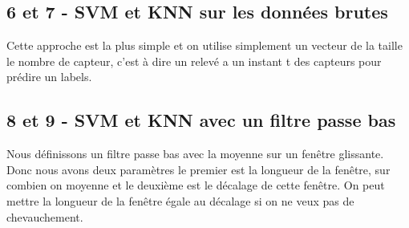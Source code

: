 \documentclass{article}[12pt]
\begin{document}
\subsection{6 et 7 - SVM et KNN sur les données brutes}
Cette approche est la plus simple et on utilise simplement un vecteur de la taille le nombre de capteur, c'est à dire un relevé a un instant t des capteurs pour prédire un labels.
\subsection{8 et 9 - SVM et KNN avec un filtre passe bas}
Nous définissons un filtre passe bas avec la moyenne sur un fenêtre glissante. Donc nous avons deux paramètres le premier est la longueur de la fenêtre, sur combien on moyenne et le deuxième est le décalage de cette fenêtre. On peut mettre la longueur de la fenêtre égale au décalage si on ne veux pas de chevauchement.
\end{document}
